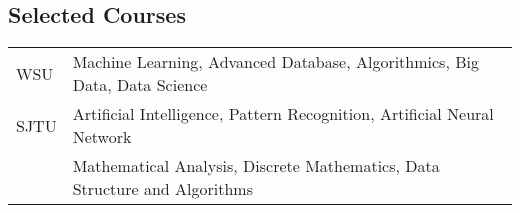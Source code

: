 \documentclass[10pt, a4paper]{article}
\begin{document}
\subsection*{Selected Courses}
\label{sec-1-8}
\begin{center}
\begin{tabularx}{\linewidth}{p{0.6in}X}
WSU & Machine Learning, Advanced Database, Algorithmics, Big Data, Data Science\\
SJTU & Artificial Intelligence, Pattern Recognition, Artificial Neural Network\\
 & Mathematical Analysis, Discrete Mathematics, Data Structure and Algorithms\\
\end{tabularx}
\end{center}
\end{document}
